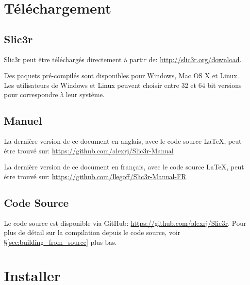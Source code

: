 

\section{T\'el\'echargement}

\subsection{Slic3r} %
\label{sub:slic3r}
Slic3r peut \^etre t\'el\'echarg\'es directement \`a partir de: \url{http://slic3r.org/download}.

Des paquets pr\'e-compil\'es sont disponibles pour Windows, Mac OS X et Linux. Les utilisateurs de Windows et Linux peuvent choisir entre 32 et 64 bit versions pour correspondre \`a leur syst\`eme.

\subsection{Manuel} %
\label{sub:manual}

La derni\`ere version de ce document en anglais, avec le code source {\LaTeX}, peut \'etre trouv\'e sur: \url{https://github.com/alexrj/Slic3r-Manual}

La derni\`ere version de ce document en fran\c{c}ais, avec le code source {\LaTeX}, peut \'etre trouv\'e sur: \url{https://github.com/llegoff/Slic3r-Manual-FR}


\subsection{Code Source} %
\label{sub:source}

Le code source est disponible via GitHub: \url{https://github.com/alexrj/Slic3r}. Pour plus de d\'etail sur la compilation depuis le code source, voir §\ref{sec:building_from_source} plus bas.


\section{Installer}

